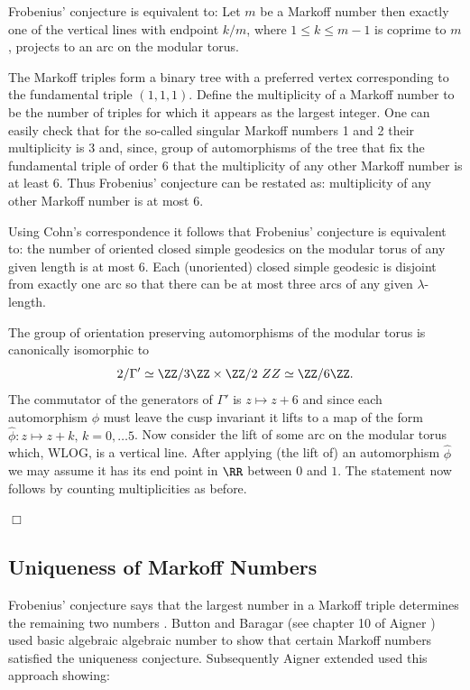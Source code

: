  \begin{thm}
Frobenius' conjecture is equivalent to:
Let $m$ be a Markoff number then exactly one of the vertical lines
with endpoint  $k/m$, where $1\leq k \leq m-1$ is coprime to $m$,
projects to an arc on the modular torus.
\end{thm}

\proof The Markoff triples form a binary tree with a preferred vertex corresponding to
the fundamental triple $(1,1,1)$. 
Define the multiplicity of a Markoff number to be the  number of triples for which
it appears as the largest integer.
One can easily check that for the so-called singular Markoff numbers 1 and 2
their multiplicity is 3
and, since,
group of automorphisms of the tree that fix the fundamental triple of order 6
that the multiplicity of any other Markoff number is at least $6$.
Thus Frobenius' conjecture can be restated as:
multiplicity of any other Markoff number is at most $6$.

Using Cohn's correspondence it follows that Frobenius' conjecture
is equivalent to: 
the number of oriented closed simple geodesics on the modular torus
of any given length is at most 6.
Each (unoriented) closed simple geodesic is disjoint from exactly one arc
so that there can be at most three arcs of any given $\lambda$-length.

The group of orientation preserving  automorphisms of the modular torus 
is canonically isomorphic to 
$$\sl2 / \Gamma' \simeq \ZZ/3\ZZ \times \ZZ/2\ ZZ \simeq \ZZ/6\ZZ .$$
The commutator of the generators of $ \Gamma'$  is $z \mapsto z + 6$
and since each automorphism $\phi$ must leave the cusp invariant it lifts to
a map of the form $\hat{\phi} : z \mapsto z + k,\, k= 0,\dots 5$.
Now consider the lift of some arc on the modular torus 
which, WLOG, is a vertical line. 
After applying (the lift of)  an automorphism $\hat{\phi}$ 
we may assume it has its end point in $\RR$ between $0$ and $1$.
The statement now follows by counting multiplicities as before.

\hfill $\Box$
 
 \subsection{Uniqueness of Markoff Numbers}
 
 Frobenius' conjecture says that the largest number in a Markoff triple determines
 the remaining two numbers \cite{aigner}. Button and Baragar (see chapter 10 of Aigner \cite{aigner})
 used  basic algebraic algebraic number to show that certain Markoff numbers satisfied
 the uniqueness conjecture. Subsequently Aigner extended used this approach showing:
 
